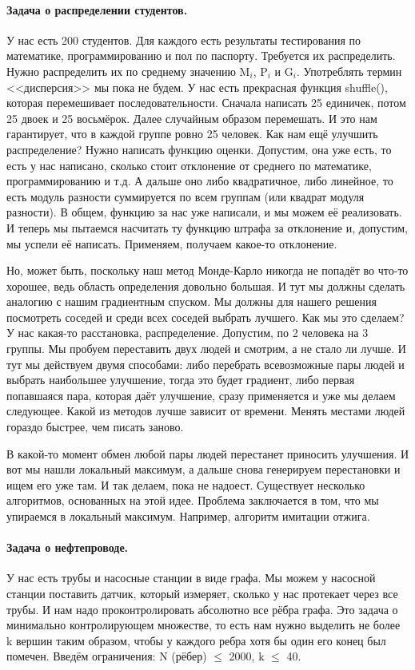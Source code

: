 \documentclass[12pt]{article}
\begin{document}
\paragraph{Задача о распределении студентов.} У нас есть 200 студентов. Для каждого есть результаты тестирования по математике, программированию и пол по паспорту. Требуется их распределить. Нужно распределить их по среднему значению M$_i$, P$_i$ и G$_i$. Употреблять термин <<дисперсия>> мы пока не будем. У нас есть прекрасная функция shuffle(), которая перемешивает последовательности. Сначала написать 25 единичек, потом 25 двоек и 25 восьмёрок. Далее случайным образом перемешать. И это нам гарантирует, что в каждой группе ровно 25 человек. Как нам ещё улучшить распределение? Нужно написать функцию оценки. Допустим, она уже есть, то есть у нас написано, сколько стоит отклонение от среднего по математике, программированию и т.д. А дальше оно либо квадратичное, либо линейное, то есть модуль разности суммируется по всем группам (или квадрат модуля разности). В общем, функцию за нас уже написали, и мы можем её реализовать. И теперь мы пытаемся насчитать ту функцию штрафа за отклонение и, допустим, мы успели её написать. Применяем, получаем какое-то отклонение.

Но, может быть, поскольку наш метод Монде-Карло никогда не попадёт во что-то хорошее, ведь область определения довольно большая. И тут мы должны сделать аналогию с нашим градиентным спуском. Мы должны для нашего решения посмотреть соседей и среди всех соседей выбрать лучшего. Как мы это сделаем? У нас какая-то расстановка, распределение. Допустим, по 2 человека на 3 группы. Мы пробуем переставить двух людей и смотрим, а не стало ли лучше. И тут мы действуем двумя способами: либо перебрать всевозможные пары людей и выбрать наибольшее улучшение, тогда это будет градиент, либо первая попавшаяся пара, которая даёт улучшение, сразу применяется и уже мы делаем следующее. Какой из методов лучше зависит от времени. Менять местами людей гораздо быстрее, чем писать заново.

В какой-то момент обмен любой пары людей перестанет приносить улучшения. И вот мы нашли локальный максимум, а дальше снова генерируем перестановки и ищем его уже там. И так делаем, пока не надоест.
Существует несколько алгоритмов, основанных на этой идее. Проблема заключается в том, что мы упираемся в локальный максимум. Например, алгоритм имитации отжига.

\paragraph{Задача о нефтепроводе.} У нас есть трубы и насосные станции в виде графа. Мы можем у насосной станции поставить датчик, который измеряет, сколько у нас протекает через все трубы. И нам надо проконтролировать абсолютно все рёбра графа. Это задача о минимально контролирующем множестве, то есть нам нужно выделить не более k вершин таким образом, чтобы у каждого ребра хотя бы один его конец был помечен. Введём ограничения: N (рёбер) $\leq$ 2000, k $\leq$ 40.
\end{document}
